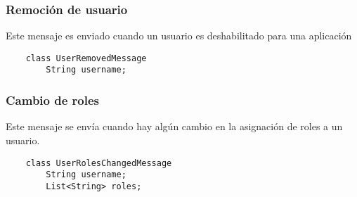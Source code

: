 \subsubsection{Remoción de usuario}
Este mensaje es enviado cuando un usuario es deshabilitado para una aplicación
  \begin{verbatim}
    class UserRemovedMessage
        String username;
  \end{verbatim}
 
\subsubsection{Cambio de roles}
Este mensaje se envía cuando hay algún cambio en la asignación de roles a un usuario.

  \begin{verbatim}
    class UserRolesChangedMessage
        String username;
        List<String> roles;
  \end{verbatim}

